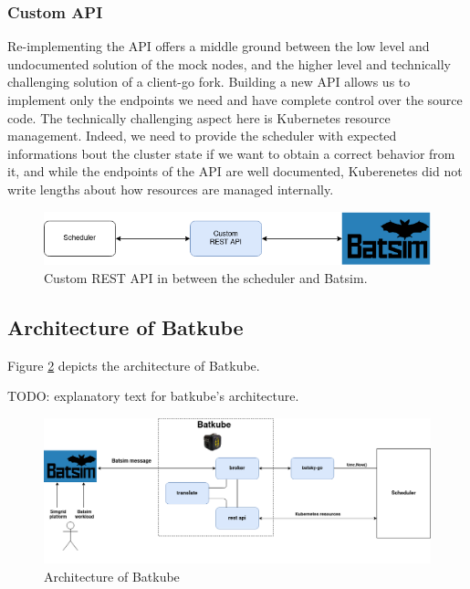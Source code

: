 \subsubsection{Custom API}

Re-implementing the API offers a middle ground between the low level and
undocumented solution of the mock nodes, and the higher level and technically
challenging solution of a client-go fork. Building a new API allows us to
implement only the endpoints we need and have complete control over the source
code. The technically challenging aspect here is Kubernetes resource
management. Indeed, we need to provide the scheduler with expected informations
bout the cluster state if we want to obtain a correct behavior from it, and
while the endpoints of the API are well documented, Kuberenetes did not write
lengths about how resources are managed internally.

\begin{figure}[h]
	\centering
	\includegraphics[width=\textwidth]{imgs/custom-restapi.png}
	\caption{Custom REST API in between the scheduler and Batsim.}
	\label{fig:custom-api}
\end{figure}

\subsection{Architecture of Batkube}

Figure \ref{fig:batkube-architecture} depicts the architecture of Batkube. 

TODO: explanatory text for batkube's architecture.

\begin{figure}[h]
	\centering
	\includegraphics[width=\textwidth]{imgs/batkube-architecture-3-synchro.png}
	\caption{Architecture of Batkube}
	\label{fig:batkube-architecture}
\end{figure}

